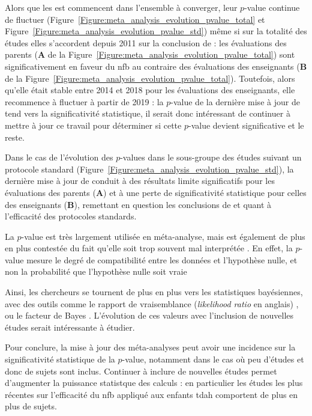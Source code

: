 Alors que les \gls{est} commencent dans l'ensemble à converger, leur $p$-value continue de fluctuer (Figure~\ref{Figure:meta_analysis_evolution_pvalue_total} et 
Figure~\ref{Figure:meta_analysis_evolution_pvalue_std}) même si sur la totalité des études elles s'accordent depuis 2011 sur la conclusion de \citet{Cortese2016} :
les évaluations des parents (\textbf{A} de la Figure~\ref{Figure:meta_analysis_evolution_pvalue_total}) sont significativement en faveur du \gls{nfb} 
au contraire des évaluations des enseignants (\textbf{B} de la Figure~\ref{Figure:meta_analysis_evolution_pvalue_total}). 
Toutefois, alors qu'elle était stable entre 2014 et 2018 pour les évaluations des enseignants, elle recommence à fluctuer à partir de 2019 : 
la $p$-value de la dernière mise à jour de \citet{Cortese2016} tend vers la significativité statistique, il serait donc intéressant 
de continuer à mettre à jour ce travail pour déterminer si cette $p$-value devient significative et le reste.

Dans le cas de l'évolution des $p$-values dans le sous-groupe des études suivant un protocole standard (Figure~\ref{Figure:meta_analysis_evolution_pvalue_std}), 
la dernière mise à jour 
de \citet{Cortese2016} conduit à des résultats limite significatifs pour les évaluations des parents (\textbf{A}) et à une perte de significativité statistique pour celles des 
enseignants (\textbf{B}), remettant en question les conclusions de \citet{Cortese2016} et \citet{Bussalb2019clinical} quant à l'efficacité des protocoles standards.
 
La $p$-value est très largement utilisée en méta-analyse, mais est également de plus en plus contestée du fait qu'elle soit trop souvent mal interprétée 
\citep{Halsey2019}. 
En effet, la $p$-value mesure le degré de compatibilité entre les données et l'hypothèse nulle, et non la probabilité que l'hypothèse nulle soit vraie

Ainsi, les chercheurs se tournent de plus en plus vers les statistiques bayésiennes, avec des outils comme le rapport de vraisemblance 
(\textit{likelihood ratio} en anglais) \citep{Dormuth2016}, ou le facteur de Bayes \citep{Morey2016, Rouder2011}. L'évolution de ces 
valeurs avec l'inclusion de nouvelles études serait intéressante à étudier. 

Pour conclure, la mise à jour des méta-analyses peut avoir une incidence sur la significativité statistique de la $p$-value, notamment dans le cas où peu d'études et donc de sujets
sont inclus. Continuer à inclure de nouvelles études permet d'augmenter la puissance statistque des calculs : en particulier les études les plus récentes sur l'efficacité du \gls{nfb}
appliqué aux enfants \gls{tdah} comportent de plus en plus de sujets.

